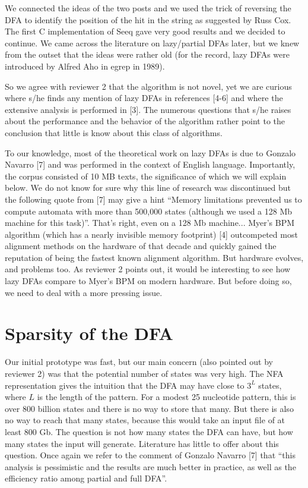 \documentclass[12pt]{article}
\begin{document}
We connected the ideas of the two posts and we used the trick of
reversing the DFA to identify the position of the hit in the string
as suggested by Russ Cox. The first C implementation of Seeq gave
very good results and we decided to continue. We came across the
literature on lazy/partial DFAs later, but we knew from the outset
that the ideas were rather old  (for the record, lazy DFAs were
introduced by Alfred Aho in egrep in 1989).

So we agree with reviewer 2 that the algorithm is not novel, yet
we are curious where s/he finds any mention of lazy DFAs in
references [4-6] and where the extensive analysis is performed in
[3]. The numerous questions that s/he raises about the performance
and the behavior of the algorithm rather point to the conclusion
that little is know about this class of algorithms.

To our knowledge, most of the theoretical work on lazy DFAs is
due to Gonzalo Navarro [7] and was performed in the context of
English language. Importantly, the corpus consisted of 10 MB texts,
the significance of which we will explain below. We do not know for
sure why this line of research
was discontinued but the following quote from [7] may give a hint
``Memory limitations prevented us to compute automata with
more than 500,000 states (although we used a 128 Mb machine for
this task)''. That's right, even on a 128 Mb machine...
Myer's BPM algorithm (which has a nearly invisible
memory footprint) [4] outcompeted most alignment methods on the
hardware of that decade and quickly gained the reputation of being
the fastest known alignment algorithm. But hardware evolves, and
problems too. As reviewer 2 points out, it would be interesting
to see how lazy DFAs compare to Myer's BPM on modern hardware.
But before doing so, we need to deal with a more pressing issue.

\section{Sparsity of the DFA}

Our initial prototype was fast, but our main concern (also
pointed out by reviewer 2) was that the potential number of states
was very high. The NFA representation gives the intuition that the
DFA may have close to $3^L$ states, where $L$ is the
length of the pattern. For a modest 25 nucleotide pattern, this
is over 800 billion states and there is no way to store that many.
But there is also no way to reach that many states,
because this would take an input file of at least 800 Gb. The
question is not how many states the DFA can have, but how many
states the input will generate. Literature has little to offer
about this question. Once again we refer to the comment of Gonzalo
Navarro [7] that ``this analysis is pessimistic and the results
are much better in practice, as well as the efficiency ratio among
partial and full DFA''.
\end{document}
